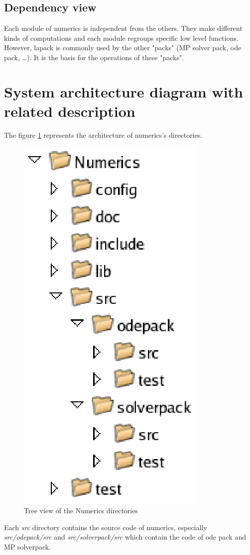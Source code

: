 \subsection{Dependency view}
Each module of \ac{numerics} is independent from the others. They make different kinds of computations and each module regroups specific low level functions.
However, \ac{lapack} is commonly used by the other "packs" (MP solver pack, \ac{ode} pack, \dots). It is the basis for the operations of these "packs".


\section{System architecture diagram with related description}
The figure \ref{fig: Tree view of the Numerics directories} represents the architecture of \ac{numerics}'s directories.
	\begin{figure}
	\begin{center}
	\includegraphics[scale=1.2, clip]{figure/NumericsDesign.eps}
	\caption{Tree view of the Numerics directories}
	\label{fig: Tree view of the Numerics directories}
	\end{center}
	\end{figure}
	
Each \textit{src} directory contains the source code of \ac{numerics}, especially \textit{src/odepack/src} and \textit{src/solverpack/src} which contain the code of \ac{ode} pack and MP solverpack.
